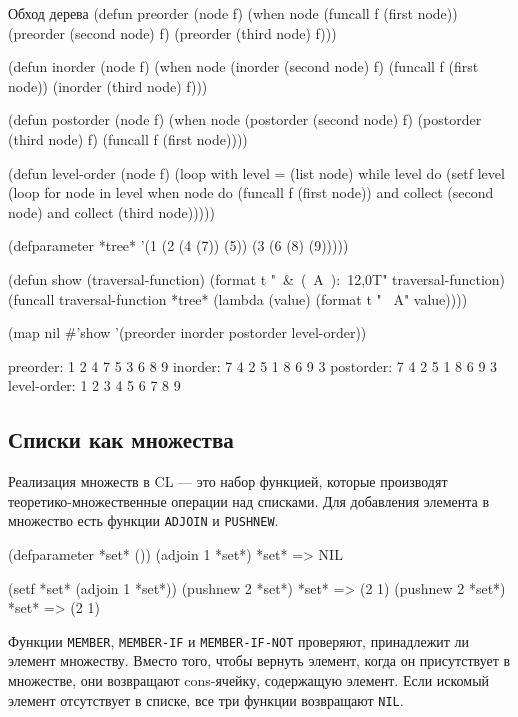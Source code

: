 \begin{cllst}{Обход дерева}{}
(defun preorder (node f)
  (when node
    (funcall f (first node))
    (preorder (second node) f)
    (preorder (third node)  f)))

(defun inorder (node f)
  (when node
    (inorder (second node) f)
    (funcall f (first node))
    (inorder (third node)  f)))

(defun postorder (node f)
  (when node
    (postorder (second node) f)
    (postorder (third node)  f)
    (funcall f (first node))))

(defun level-order (node f)
  (loop with level = (list node)
        while level
        do
    (setf level (loop for node in level
                      when node
                        do (funcall f (first node))
                        and collect (second node)
                        and collect (third node)))))

(defparameter *tree* '(1 (2 (4 (7))
                            (5))
                         (3 (6 (8)
                               (9)))))

(defun show (traversal-function)
  (format t "~&~(~A~):~12,0T" traversal-function)
  (funcall traversal-function *tree* (lambda (value) (format t " ~A" value))))

(map nil #'show '(preorder inorder postorder level-order))
\end{cllst}
\begin{plainlst}{}{}
preorder:    1 2 4 7 5 3 6 8 9
inorder:     7 4 2 5 1 8 6 9 3
postorder:   7 4 2 5 1 8 6 9 3
level-order: 1 2 3 4 5 6 7 8 9
\end{plainlst}

\subsection{Списки как множества}
Реализация множеств в CL — это набор функцией, которые производят теоретико-множественные операции над списками. Для добавления элемента в множество есть функции \lstinline{ADJOIN} и \lstinline{PUSHNEW}.
\begin{cllst}{}{}
(defparameter *set* ())
(adjoin 1 *set*)
*set* => NIL

(setf *set* (adjoin 1 *set*))
(pushnew 2 *set*)
*set* => (2 1)
(pushnew 2 *set*)
*set* => (2 1)
\end{cllst}

Функции \lstinline{MEMBER}, \lstinline{MEMBER-IF} и \lstinline{MEMBER-IF-NOT} проверяют, принадлежит ли элемент множеству. Вместо того, чтобы вернуть элемент, когда он присутствует в множестве, они возвращают cons-ячейку, содержащую элемент. Если искомый элемент отсутствует в списке, все три функции возвращают \lstinline{NIL}.

